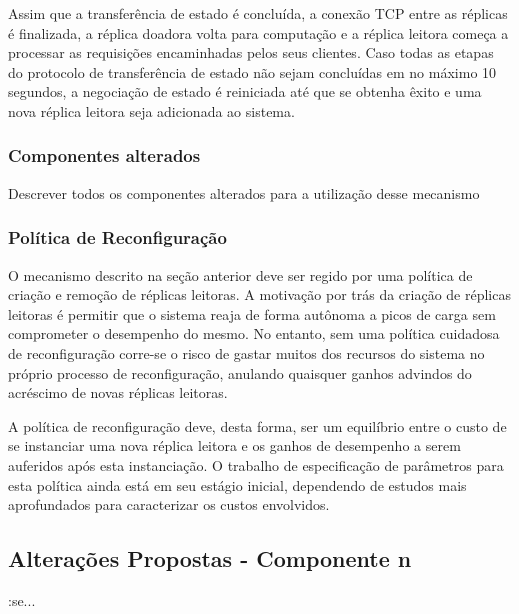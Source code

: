 Assim que a transferência de estado é concluída, a conexão TCP entre as réplicas é
finalizada, a réplica doadora volta para computação e a réplica leitora começa a processar
as requisições encaminhadas pelos seus clientes. Caso todas as etapas do protocolo de
transferência de estado não sejam concluídas em no máximo 10 segundos, a negociação de
estado  é reiniciada até que se obtenha êxito e uma nova  réplica leitora seja adicionada
ao sistema.

\subsubsection{Componentes alterados}

Descrever todos os componentes alterados para a utilização desse mecanismo

\subsubsection{Política de Reconfiguração}

O mecanismo descrito na seção anterior deve ser regido por uma política de criação e
remoção de réplicas leitoras. A  motivação por trás da criação de réplicas leitoras é
permitir que o sistema reaja de forma autônoma a picos de carga sem comprometer o
desempenho do mesmo. No entanto, sem uma política cuidadosa de reconfiguração corre-se o
risco de gastar muitos dos recursos do sistema no próprio processo de reconfiguração,
anulando quaisquer ganhos advindos do acréscimo de novas réplicas leitoras.

A política de reconfiguração deve, desta forma, ser um equilíbrio entre o custo de se
instanciar uma nova réplica leitora e os ganhos de desempenho a serem auferidos após esta
instanciação. O trabalho de especificação de parâmetros para esta política ainda está em
seu estágio inicial, dependendo de estudos mais aprofundados para caracterizar os custos
envolvidos.



\subsection{Alterações Propostas - Componente n}

:se...

